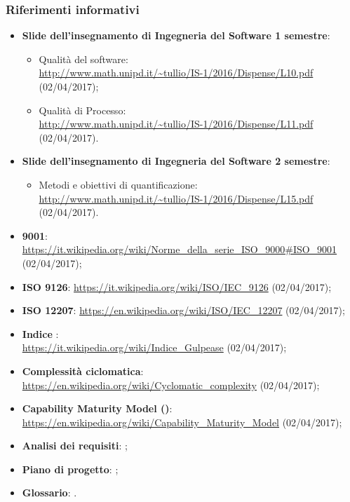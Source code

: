 \documentclass[../PianoDiQualifica.tex]{subfiles}
\begin{document}
			\subsubsection{Riferimenti informativi}	
				\begin{itemize}
					\item \textbf{Slide dell'insegnamento di Ingegneria del Software
					1 semestre}:
						\begin{itemize}
							\item Qualità del software:\\
							\url{http://www.math.unipd.it/~tullio/IS-1/2016/Dispense/L10.pdf} (02/04/2017);
							\item Qualità di Processo:\\
							\url{http://www.math.unipd.it/~tullio/IS-1/2016/Dispense/L11.pdf} (02/04/2017).
						\end{itemize}
					\item \textbf{Slide dell'insegnamento di Ingegneria del Software
					2 semestre}:
						\begin{itemize}
							\item Metodi e obiettivi di quantificazione:\\
							\url{http://www.math.unipd.it/~tullio/IS-1/2016/Dispense/L15.pdf} (02/04/2017).
						\end{itemize}
					\item \textbf{ 9001}:\\
					\url{https://it.wikipedia.org/wiki/Norme_della_serie_ISO_9000#ISO_9001} (02/04/2017);
					\item \textbf{ISO 9126}: \url{https://it.wikipedia.org/wiki/ISO/IEC_9126} (02/04/2017);
					\item \textbf{ISO 12207}: \url{https://en.wikipedia.org/wiki/ISO/IEC_12207} (02/04/2017);
					\item \textbf{Indice }:\\
					\url{https://it.wikipedia.org/wiki/Indice_Gulpease} (02/04/2017);
					\item \textbf{Complessità ciclomatica}:\\
					\url{https://en.wikipedia.org/wiki/Cyclomatic_complexity} (02/04/2017);
					\item \textbf{Capability Maturity Model ()}:\\
					\url{https://en.wikipedia.org/wiki/Capability_Maturity_Model} (02/04/2017);
					\item \textbf{Analisi dei requisiti}: \analisideirequisitiv;
					\item \textbf{Piano di progetto}: \pianodiprogettov;
					\item \textbf{Glossario}: \glossariov.
				\end{itemize}
\end{document}
